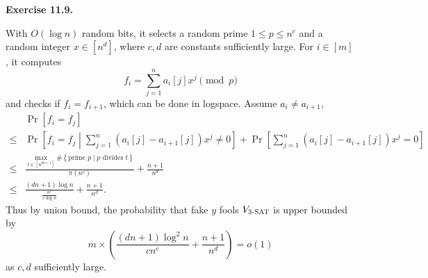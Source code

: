 \documentclass[a4paper]{article}
\newenvironment{exercise}[1]{
	\par
	\noindent\textbf{Exercise #1.}\quad
}{
	\par
	\bigskip
}
\newcommand{\pbra}[1]{\left( #1 \right)}
\newcommand{\cbra}[1]{\left\{ #1 \right\}}
\newcommand{\sbra}[1]{\left[ #1 \right]}
\begin{document}
\begin{exercise}{11.9}
\begin{itemize}
\begin{itemize}
                        With $O(\log n)$ random bits, 
                        it selects a random prime $1\leq p\leq n^c$ and a random integer $x\in[n^d]$, 
                        where $c,d$ are constants sufficiently large.
                        For $i\in[m]$, it computes 
                        $$
                        f_i=\sum_{j=1}^na_i[j]x^j\pmod{p}
                        $$
                        and checks if $f_i=f_{i+1}$, which can be done in logspace.
                        Assume $a_i\neq a_{i+1}$, 
                        \begin{align*}
                            &\Pr\sbra{f_i=f_j}\\
                            \leq&\Pr\sbra{f_i=f_j\middle|\sum_{j=1}^n(a_i[j]-a_{i+1}[j])x^j\neq0}
                            +\Pr\sbra{\sum_{j=1}^n(a_i[j]-a_{i+1}[j])x^j=0}\\
                            \leq&
                            \frac{\displaystyle\max_{t\in\sbra{n^{dn+1}}}\#\cbra{\text{prime }p\middle|p\text{ divides }t}}
                            {\pi(n^c)}
                            +\frac{n+1}{n^d}\\
                            \leq&
                            \frac{(dn+1)\log n}{\frac{n^c}{c\log n}}+\frac{n+1}{n^d}.
                        \end{align*}
                        Thus by union bound, the probability that fake $y$ fools $V_\textsc{3-SAT}$ is upper bounded by
                        $$
                            m\times\pbra{\frac{(dn+1)\log^2 n}{cn^c}+\frac{n+1}{n^d}}=o(1)
                        $$
                        as $c,d$ sufficiently large.
                \end{itemize}
        \end{itemize}
    \end{exercise}
\end{document}

